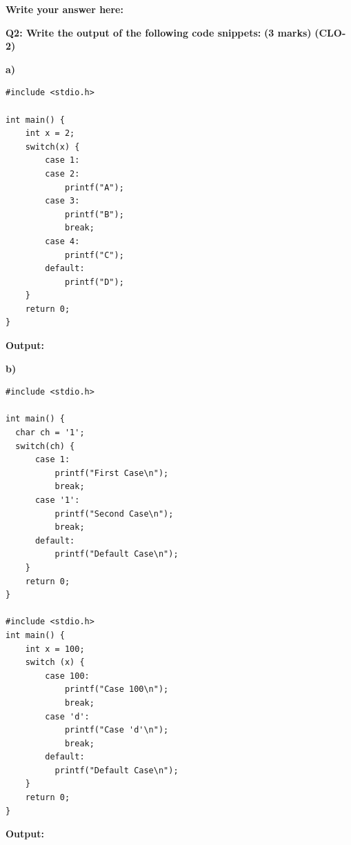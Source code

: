 \documentclass[a4paper,12pt]{article}
\begin{document}
\textbf{Write your answer here:}
\begin{tcolorbox}[colframe=black, colback=white, width=\textwidth, height=23cm, valign=center]
\end{tcolorbox}

\vspace{1.5cm}

\textbf{Q2: Write the output of the following code snippets:} \hfill \textbf{(3 marks)} \textbf{(CLO-2)}

\begin{minipage}[t]{0.48\textwidth}
\textbf{a)}
\begin{verbatim}
#include <stdio.h>

int main() {
    int x = 2;
    switch(x) {
        case 1:
        case 2:
            printf("A");
        case 3:
            printf("B");
            break;
        case 4:
            printf("C");
        default:
            printf("D");
    }
    return 0;
}
\end{verbatim}

\textbf{Output:}
\begin{tcolorbox}[colframe=black, colback=white, width=\textwidth, height=13cm, valign=center]
\end{tcolorbox}
\end{minipage}\hfill
\begin{minipage}[t]{0.48\textwidth}
\textbf{b)}
\begin{verbatim}
#include <stdio.h>

int main() {
  char ch = '1';
  switch(ch) {
      case 1:
          printf("First Case\n");
          break;
      case '1':
          printf("Second Case\n");
          break;
      default:
          printf("Default Case\n");
    }
    return 0;
}

#include <stdio.h>
int main() {
    int x = 100;
    switch (x) {
        case 100:
            printf("Case 100\n");
            break;
        case 'd':
            printf("Case 'd'\n");
            break;
        default:
          printf("Default Case\n");
    }
    return 0;
}
\end{verbatim}

\textbf{Output:}
\begin{tcolorbox}[colframe=black, colback=white, width=\textwidth, height=5.810cm, valign=center]
\end{tcolorbox}
\end{minipage}

\vspace{0.5cm} %
\end{document}
